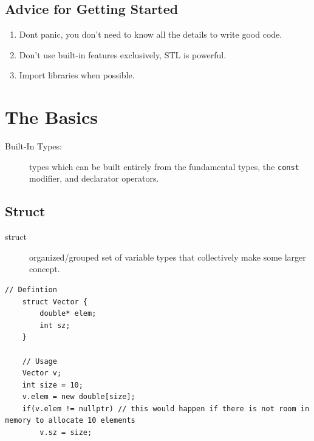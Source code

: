 \documentclass[a4paper, 10pt]{article}
\begin{document}
\subsection{Advice for Getting Started}
\begin{enumerate}
	\item Dont panic, you don't need to know all the details to write good code.
	\item Don't use built-in features exclusively, STL is powerful.
	\item Import libraries when possible.
\end{enumerate}



\section{The Basics}
\begin{description}
	\item[Built-In Types:]
	      types which can be built entirely from the fundamental types, the \verb!const! modifier, and declarator operators.
\end{description}
\subsection{Struct}
\begin{description}
	\item[struct]
	      organized/grouped set of variable types that collectively make some larger concept.
\end{description}
\begin{lstlisting}[style=cpp]
    // Defintion
    struct Vector {
        double* elem;
        int sz;
    }

    // Usage
    Vector v;
    int size = 10;
    v.elem = new double[size];
    if(v.elem != nullptr) // this would happen if there is not room in memory to allocate 10 elements
        v.sz = size;
\end{lstlisting}
\end{document}
